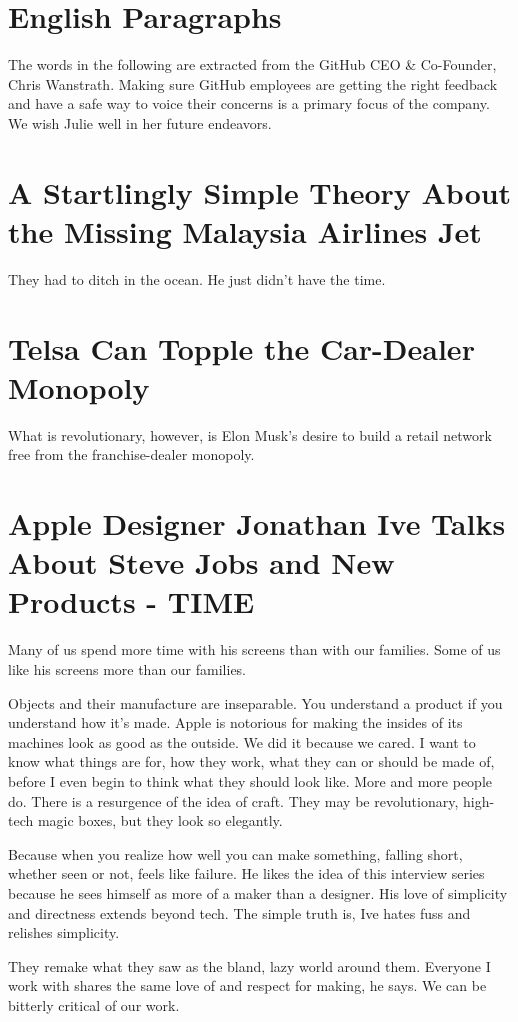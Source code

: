 \section{English Paragraphs}
The words in the following are extracted from the GitHub CEO \& Co-Founder, Chris Wanstrath.
Making sure GitHub employees are getting the right feedback and have a safe way to voice their concerns is a primary focus of the company.
We wish Julie well in her future endeavors.

\section{A Startlingly Simple Theory About the Missing Malaysia Airlines Jet}

They had to ditch in the ocean. He just didn't have the time.

\section{Telsa Can Topple the Car-Dealer Monopoly}
What is revolutionary, however, is Elon Musk's desire to build a retail network free from the franchise-dealer monopoly.

\section{Apple Designer Jonathan Ive Talks About Steve Jobs and New Products - TIME}
Many of us spend more time with his screens than with our families. Some of us like his screens more than our families.

Objects and their manufacture are inseparable. You understand a
product if you understand how it's made.
Apple is notorious for making the insides of its machines look as good as the outside.
We did it because we cared.
I want to know what things are for, how they work, what they can or should be made of, before I even begin to think what they should look like. More and more people do. There is a resurgence of the idea of craft.
They may be revolutionary, high-tech magic boxes, but they look so elegantly.

Because when you realize how well you can make something, falling short, whether seen or not, feels like failure.
He likes the idea of this interview series because he sees himself as more of a maker than a designer.
His love of simplicity and directness extends beyond tech.
The simple truth is, Ive hates fuss and relishes simplicity.

They remake what they saw as the bland, lazy world around them.
Everyone I work with shares the same love of and respect for making, he says.
We can be bitterly critical of our work.


